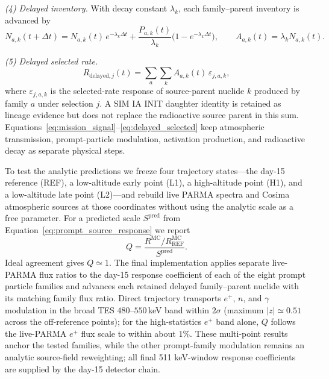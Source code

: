 \documentclass[11pt]{article}
\begin{document}
\emph{(4) Delayed inventory.} With decay constant $\lambda_k$, each family--parent
inventory is advanced by
\begin{equation}
  N_{a,k}(t+\Delta t)=N_{a,k}(t)\,e^{-\lambda_k\Delta t}
  +\frac{P_{a,k}(t)}{\lambda_k}\bigl(1-e^{-\lambda_k\Delta t}\bigr),
  \qquad A_{a,k}(t)=\lambda_k N_{a,k}(t).
  \label{eq:delayed_inventory}
\end{equation}

\emph{(5) Delayed selected rate.}
\begin{equation}
  R_{\mathrm{delayed},j}(t)=\sum_{a}\sum_{k} A_{a,k}(t)\,\varepsilon_{j,a,k},
  \label{eq:delayed_selected}
\end{equation}
where $\varepsilon_{j,a,k}$ is the selected-rate response of source-parent
nuclide $k$ produced by family $a$ under selection $j$. A SIM IA INIT daughter
identity is retained as lineage evidence but does not replace the radioactive
source parent in this sum. Equations~\eqref{eq:mission_signal}--\eqref{eq:delayed_selected}
keep atmospheric transmission, prompt-particle modulation, activation production,
and radioactive decay as separate physical steps.

To test the analytic predictions we freeze four trajectory states---the day-15 reference (REF), a low-altitude early point (L1), a high-altitude point (H1), and a low-altitude late point (L2)---and rebuild live PARMA spectra and Cosima atmospheric sources at those coordinates without using the analytic scale as a free parameter. For a predicted scale $S^{\mathrm{pred}}$ from Equation~\eqref{eq:prompt_source_response} we report
\begin{equation}
  Q=\frac{R^{\mathrm{MC}}/R^{\mathrm{MC}}_{\mathrm{REF}}}{S^{\mathrm{pred}}}.
\end{equation}
Ideal agreement gives $Q\simeq1$. The final implementation applies separate
live-PARMA flux ratios to the day-15 response coefficient of each of the eight
prompt particle families and advances each retained delayed family--parent
nuclide with its matching family flux ratio. Direct trajectory transports  $e^+$,
$n$, and $\gamma$ modulation in the broad TES $480$--$550$\,keV band within
$2\sigma$ (maximum $|z|\simeq0.51$ across the off-reference points); for the
high-statistics $e^+$ band alone, $Q$ follows the live-PARMA $e^+$ flux scale
to within about $1\%$. These multi-point results anchor the tested families,
while the other prompt-family modulation remains an analytic source-field
reweighting; all final 511 keV-window response coefficients are supplied by the
day-15 detector chain.
\end{document}
